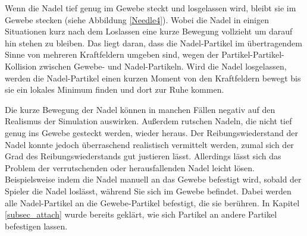 Wenn die Nadel tief genug im Gewebe steckt und losgelassen wird, bleibt sie im Gewebe stecken (siehe Abbildung \ref{Needle4}). Wobei die Nadel in einigen Situationen kurz nach dem Loslassen eine kurze Bewegung vollzieht um darauf hin stehen zu bleiben. Das liegt daran, dass die Nadel-Partikel im übertragendem Sinne von mehreren Kraftfeldern umgeben sind, wegen der Partikel-Partikel-Kollision zwischen Gewebe- und Nadel-Partikeln. Wird die Nadel losgelassen, werden die Nadel-Partikel einen kurzen Moment von den Kraftfeldern bewegt bis sie ein lokales Minimum finden und dort zur Ruhe kommen. 

Die kurze Bewegung der Nadel können in manchen Fällen negativ auf den Realismus der Simulation auswirken. Außerdem rutschen Nadeln, die nicht tief genug ins Gewebe gesteckt werden, wieder heraus. Der Reibungswiederstand der Nadel konnte jedoch überraschend realistisch vermittelt werden, zumal sich der Grad des Reibungswiederstands gut justieren lässt. Allerdings lässt sich das Problem der verrutschenden oder herausfallenden Nadel leicht lösen. Beispielsweise indem die Nadel manuell an das Gewebe befestigt wird, sobald der Spieler die Nadel loslässt, während Sie sich im Gewebe befindet. Dabei werden alle Nadel-Partikel an die Gewebe-Partikel befestigt, die sie berühren. In Kapitel \ref{subsec_attach} wurde bereits geklärt, wie sich Partikel an andere Partikel befestigen lassen. 

%






%
%

